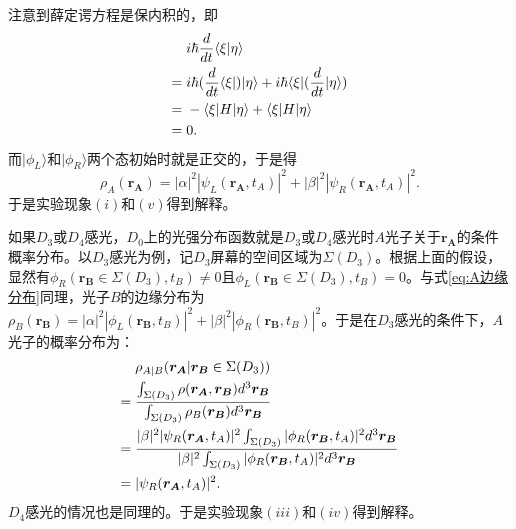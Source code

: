 注意到薛定谔方程是保内积的，即
\begin{align}
&i\hbar\frac{d}{dt}\langle\xi|\eta\rangle \notag \\
={}&i\hbar(\frac{d}{dt}\langle\xi|)|\eta\rangle+i\hbar\langle\xi|(\frac{d}{dt}|\eta\rangle) \notag \\
={}&-\langle\xi|H|\eta\rangle+\langle\xi|H|\eta\rangle \notag \\
={}&0.
\end{align}
而$|\phi_L\rangle$和$|\phi_R\rangle$两个态初始时就是正交的，于是得
\begin{equation}
\rho_A(\boldsymbol{r_A})=|\alpha|^2|\psi_L(\boldsymbol{r_A},t_A)|^2+|\beta|^2|\psi_R(\boldsymbol{r_A},t_A)|^2.
\label{eq:A边缘分布}
\end{equation}
于是实验现象$(i)$和$(v)$得到解释。

如果$D_3$或$D_4$感光，$D_0$上的光强分布函数就是$D_3$或$D_4$感光时$A$光子关于$\boldsymbol{r_A}$的条件概率分布。以$D_3$感光为例，记$D_3$屏幕的空间区域为$\Sigma(D_3)$。根据上面的假设，显然有$\phi_R(\boldsymbol{r_B}\in\Sigma(D_3),t_B)\neq 0$且$\phi_L(\boldsymbol{r_B}\in\Sigma(D_3),t_B)=0$。与式\ref{eq:A边缘分布}同理，光子$B$的边缘分布为$\rho_B(\boldsymbol{r_B})=|\alpha|^2|\phi_L(\boldsymbol{r_B},t_B)|^2+|\beta|^2|\phi_R(\boldsymbol{r_B},t_B)|^2$。于是在$D_3$感光的条件下，$A$光子的概率分布为：
\begin{align}
&\rho_{A|B}(\boldsymbol{r_A}|\boldsymbol{r_B}\in\Sigma(D_3)) \notag \\
={}&\frac{\int_{\Sigma(D_3)}\rho(\boldsymbol{r_A},\boldsymbol{r_B})d^3\boldsymbol{r_B}}{\int_{\Sigma(D_3)}\rho_B(\boldsymbol{r_B})d^3\boldsymbol{r_B}} \notag \\
={}&\frac{|\beta|^2|\psi_R(\boldsymbol{r_A},t_A)|^2\int_{\Sigma(D_3)}|\phi_R(\boldsymbol{r_B},t_A)|^2d^3\boldsymbol{r_B}}{|\beta|^2\int_{\Sigma(D_3)}|\phi_R(\boldsymbol{r_B},t_A)|^2d^3\boldsymbol{r_B}} \notag \\
={}&|\psi_R(\boldsymbol{r_A},t_A)|^2.
\end{align}
$D_4$感光的情况也是同理的。于是实验现象$(iii)$和$(iv)$得到解释。

